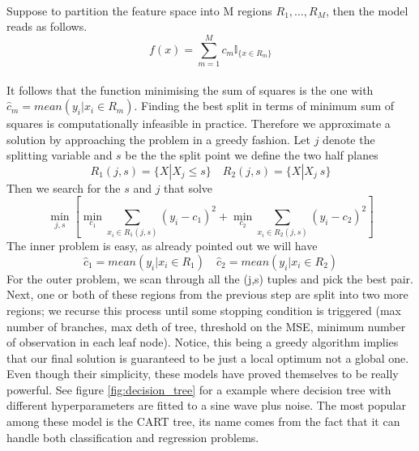 \\
Suppose to partition the feature space into M regions $R_1,\dots,R_M$, then the model reads as follows.
\begin{equation}
    f(x)=\sum\limits_{m=1}^{M}c_m\mathbb{I}_{\{x \in R_m\}}
\end{equation}
\\
It follows that the function minimising the sum of squares is the one with $\hat{c}_m=mean(y_i|x_i \in R_m)$.
Finding the best split in terms of minimum sum of squares is computationally infeasible in practice. Therefore we approximate a solution by approaching the problem in a greedy fashion.
Let $j$ denote the splitting variable and $s$ be the the split point we define the two half planes
\begin{equation}
    R_1(j,s)=\{X|X_j\leq s\} \quad R_2(j,s)=\{X|X_j\>s\}
\end{equation}
Then we search for the $s$ and $j$ that solve
\begin{equation}
    \min_{j,s}\left[\min_{c_1} \sum\limits_{x_i \in R_1(j,s)}(y_i-c_1)^2+\min_{c_2} \sum\limits_{x_i \in R_2(j,s)}(y_i-c_2)^2\right]
\end{equation}
The inner problem is easy, as already pointed out we will have 
\begin{equation}
    \hat{c}_1=mean(y_i|x_i \in R_1) \quad \hat{c}_2=mean(y_i|x_i \in R_2)
\end{equation}
For the outer problem, we scan through all the (j,s) tuples and pick the best pair. 
Next, one or both of these regions from the previous step are split into two more regions; we recurse this process until some stopping condition is triggered (max number of branches, max deth of tree, threshold on the MSE, minimum number of observation in each leaf node).
Notice, this being a greedy algorithm implies that our final solution is guaranteed to be just a local optimum not a global one.
Even though their simplicity, these models have proved themselves to be really powerful. See figure \ref{fig:decision_tree} for a example where decision tree with different hyperparameters are fitted to a sine wave plus noise. The most popular among these model is the CART \cite{breiman2017classification} tree, its name comes from the fact that it can handle both classification and regression problems.
